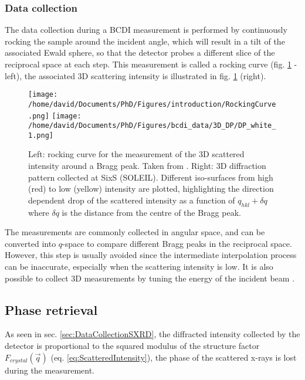 \subsubsection{Data collection} \label{sec:DataCollectionBCDI}

The data collection during a BCDI measurement is performed by continuously rocking the sample around the incident angle, which will result in a tilt of the associated Ewald sphere, so that the detector probes a different slice of the reciprocal space at each step.
This measurement is called a rocking curve (fig. \ref{fig:3DDP} - left), the associated 3D scattering intensity is illustrated in fig. \ref{fig:3DDP} (right).

\begin{figure}[!htb]
    \centering
    \texttt{[image: /home/david/Documents/PhD/Figures/introduction/RockingCurve.png]}
    \texttt{[image: /home/david/Documents/PhD/Figures/bcdi\_data/3D\_DP/DP\_white\_1.png]}
    \caption{
    Left: rocking curve for the measurement of the 3D scattered intensity around a Bragg peak. Taken from \cite{Willmott}.
    Right: 3D diffraction pattern collected at SixS (SOLEIL).
    Different iso-surfaces from high (red) to low (yellow) intensity are plotted, highlighting the direction dependent drop of the scattered intensity as a function of $q_{hkl}+\delta q$ where $\delta q$ is the distance from the centre of the Bragg peak.
    }
    \label{fig:3DDP}
\end{figure}

The measurements are commonly collected in angular space, and can be converted into $q$-space to compare different Bragg peaks in the reciprocal space.
However, this step is usually avoided since the intermediate interpolation process can be inaccurate, especially when the scattering intensity is low.
It is also possible to collect 3D measurements by tuning the energy of the incident beam \parencite{Cornelius2011}.

\subsection{Phase retrieval}\label{sec:PhaseRetrieval}

As seen in sec. \ref{sec:DataCollectionSXRD}, the diffracted intensity collected by the detector is proportional to the squared modulus of the structure factor $F_{crystal}(\vec{q})$ (eq. \ref{eq:ScatteredIntensity}), the phase of the scattered x-rays is lost during the measurement.

